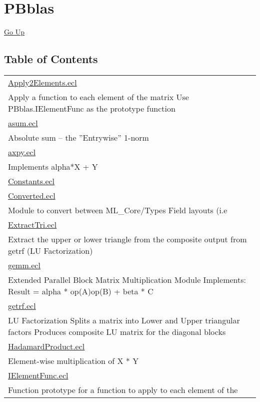 \chapter*{\color{headtoc} PBblas}
\hypertarget{ecldoc:toc:root/PBblas}{}
\hyperlink{ecldoc:toc:}{Go Up}


\section*{Table of Contents}
{\renewcommand{\arraystretch}{1.5}
\begin{longtable}{|p{\textwidth}|}
\hline
\hyperlink{ecldoc:toc:PBblas.Apply2Elements}{Apply2Elements.ecl} \\
Apply a function to each element of the matrix Use PBblas.IElementFunc as the prototype function \\
\hline
\hyperlink{ecldoc:toc:PBblas.asum}{asum.ecl} \\
Absolute sum -- the ''Entrywise'' 1-norm \\
\hline
\hyperlink{ecldoc:toc:PBblas.axpy}{axpy.ecl} \\
Implements alpha*X + Y \\
\hline
\hyperlink{ecldoc:toc:PBblas.Constants}{Constants.ecl} \\
\hline
\hyperlink{ecldoc:toc:PBblas.Converted}{Converted.ecl} \\
Module to convert between ML\_Core/Types Field layouts (i.e \\
\hline
\hyperlink{ecldoc:toc:PBblas.ExtractTri}{ExtractTri.ecl} \\
Extract the upper or lower triangle from the composite output from getrf (LU Factorization) \\
\hline
\hyperlink{ecldoc:toc:PBblas.gemm}{gemm.ecl} \\
Extended Parallel Block Matrix Multiplication Module Implements: Result = alpha * op(A)op(B) + beta * C \\
\hline
\hyperlink{ecldoc:toc:PBblas.getrf}{getrf.ecl} \\
LU Factorization Splits a matrix into Lower and Upper triangular factors Produces composite LU matrix for the diagonal blocks \\
\hline
\hyperlink{ecldoc:toc:PBblas.HadamardProduct}{HadamardProduct.ecl} \\
Element-wise multiplication of X * Y \\
\hline
\hyperlink{ecldoc:toc:PBblas.IElementFunc}{IElementFunc.ecl} \\
Function prototype for a function to apply to each element of the \\

\end{longtable}}
